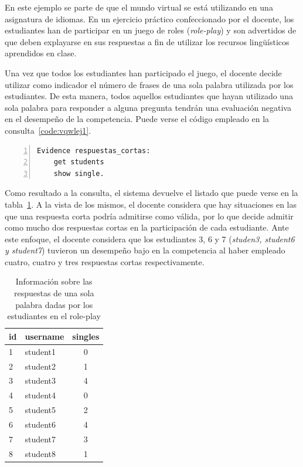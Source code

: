 			En este ejemplo se parte de que el mundo virtual se está utilizando en una asignatura de idiomas. En un ejercicio práctico confeccionado por el docente, los estudiantes han de participar en un juego de roles (\emph{role-play}) y son advertidos de que deben explayarse en sus respuestas a fin de utilizar los recursos lingüísticos aprendidos en clase.

			Una vez que todos los estudiantes han participado el juego, el docente decide utilizar como indicador el número de frases de una sola palabra utilizada por los estudiantes. De esta manera, todos aquellos estudiantes que hayan utilizado una sola palabra para responder a alguna pregunta tendrán una evaluación negativa en el desempeño de la competencia. Puede verse el código empleado en la consulta~\ref{code:vqwlej1}.

\begin{center}
\begin{lstlisting}[caption=Consulta para obtener la cantidad de respuestas de una sola palabra de cada estudiante, label=code:vqwlej1,numbers=left, captionpos=b, morekeywords={Evidence,get, students, single, show, words, sentences, turns, time, points}]
Evidence respuestas_cortas:
    get students
    show single.
\end{lstlisting}
\end{center}

			Como resultado a la consulta, el sistema devuelve el listado que puede verse en la tabla~\ref{tab:EvsListEj1}. A la vista de los mismos, el docente considera que hay situaciones en las que una respuesta corta podría admitirse como válida, por lo que decide admitir como mucho dos respuestas cortas en la participación de cada estudiante. Ante este enfoque, el docente considera que los estudiantes 3, 6 y 7 (\emph{studen3, student6 y student7}) tuvieron un desempeño bajo en la competencia al haber empleado cuatro, cuatro y tres respuestas cortas respectivamente.

\begin{table}
	\centering
	\caption{Información sobre las respuestas de una sola palabra dadas por los estudiantes en el role-play}
	\label{tab:EvsListEj1}
	\begin{tabular}{|l|l|c|}
		\hline
		id & username & singles \\
		\hline
		\hline
		1 & student1 & 0  \\
		\hline
		2 & student2 & 1  \\
		\hline
		3 & student3 & 4  \\
		\hline
		4 & student4 & 0  \\
		\hline
		5 & student5 & 2  \\
		\hline
		6 & student6 & 4  \\
		\hline
		7 & student7 & 3  \\
		\hline
		8 & student8 & 1  \\
		\hline
	\end{tabular}
\end{table}

